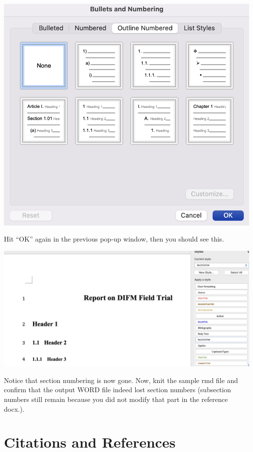 \documentclass[
  letterpaper,
  DIV=11,
  numbers=noendperiod]{scrreprt}
\begin{document}
\includegraphics[width=1\textwidth,height=\textheight]{assets/pictures/style-change-6.png}

Hit ``OK'' again in the previous pop-up window, then you should see
this.

\includegraphics[width=1\textwidth,height=\textheight]{assets/pictures/style-change-7.png}

Notice that section numbering is now gone. Now, knit the sample rmd file
and confirm that the output WORD file indeed lost section numbers
(subsection numbers still remain because you did not modify that part in
the reference docx.).

\hypertarget{citations-and-references}{%
\section{Citations and References}\label{citations-and-references}}
\end{document}
